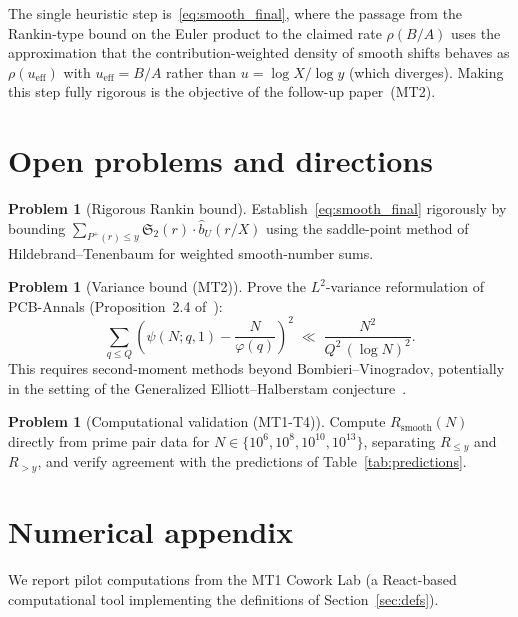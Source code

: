 \documentclass[11pt,reqno]{amsart}
\theoremstyle{plain}
\theoremstyle{definition}
\newtheorem{problem}[theorem]{Problem}
\theoremstyle{remark}
\newcommand{\Rsmooth}{R_{\mathrm{smooth}}}
\newcommand{\Sfrak}{\mathfrak{S}_2}
\newcommand{\Pplus}{P^{+}}
\begin{document}
The single heuristic step is~\eqref{eq:smooth_final}, where
the passage from the Rankin-type bound on the Euler product to the
claimed rate $\rho(B/A)$ uses the approximation that the
contribution-weighted density of smooth shifts behaves as
$\rho(u_{\mathrm{eff}})$ with $u_{\mathrm{eff}} = B/A$ rather than
$u = \log X / \log y$ (which diverges). Making this step fully
rigorous is the objective of the follow-up paper~(MT2).

\section{Open problems and directions}\label{sec:gaps}

\begin{problem}[Rigorous Rankin bound]\label{prob:rankin}
Establish~\eqref{eq:smooth_final} rigorously by bounding
$\sum_{\Pplus(r) \le y} \Sfrak(r) \cdot \hat{b}_U(r/X)$
using the saddle-point method of Hildebrand--Tenenbaum
for weighted smooth-number sums.
\end{problem}

\begin{problem}[Variance bound (MT2)]\label{prob:variance}
Prove the $L^2$-variance reformulation of PCB-Annals
(Proposition~2.4 of~\cite{G37}):
\[
  \sum_{q \le Q} \left(\psi(N;q,1) - \frac{N}{\varphi(q)}\right)^{\!2}
  \;\ll\; \frac{N^2}{Q^2\,(\log N)^2}.
\]
This requires second-moment methods beyond Bombieri--Vinogradov,
potentially in the setting of the Generalized Elliott--Halberstam
conjecture~\cite{Polymath2014}.
\end{problem}

\begin{problem}[Computational validation (MT1-T4)]\label{prob:T4}
Compute $\Rsmooth(N)$ directly from prime pair data for
$N \in \{10^6, 10^8, 10^{10}, 10^{13}\}$, separating $R_{\le y}$
and $R_{> y}$, and verify agreement with the predictions of
Table~\ref{tab:predictions}.
\end{problem}

\section{Numerical appendix}\label{sec:numerics}

We report pilot computations from the MT1 Cowork Lab (a React-based
computational tool implementing the definitions of Section~\ref{sec:defs}).
\end{document}
